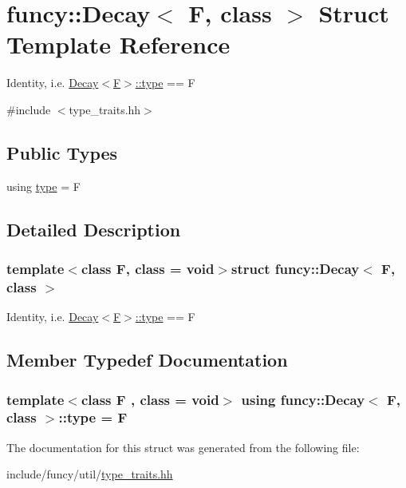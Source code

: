 \hypertarget{structfuncy_1_1Decay}{\section{funcy\-:\-:Decay$<$ F, class $>$ Struct Template Reference}
\label{structfuncy_1_1Decay}
}


Identity, i.\-e. \hyperlink{structfuncy_1_1Decay_a94829178cc43a1c71c43511c8a8836c6}{Decay$<$\-F$>$\-::type} == F  




{\ttfamily \#include $<$type\-\_\-traits.\-hh$>$}

\subsection*{Public Types}
\begin{DoxyCompactItemize}
\item 
using \hyperlink{structfuncy_1_1Decay_a94829178cc43a1c71c43511c8a8836c6}{type} = F
\end{DoxyCompactItemize}


\subsection{Detailed Description}
\subsubsection*{template$<$class F, class = void$>$struct funcy\-::\-Decay$<$ F, class $>$}

Identity, i.\-e. \hyperlink{structfuncy_1_1Decay_a94829178cc43a1c71c43511c8a8836c6}{Decay$<$\-F$>$\-::type} == F 

\subsection{Member Typedef Documentation}
\hypertarget{structfuncy_1_1Decay_a94829178cc43a1c71c43511c8a8836c6}{
\subsubsection[{type}]{\setlength{\rightskip}{0pt plus 5cm}template$<$class F , class  = void$>$ using {\bf funcy\-::\-Decay}$<$ F, class $>$\-::{\bf type} =  F}}\label{structfuncy_1_1Decay_a94829178cc43a1c71c43511c8a8836c6}


The documentation for this struct was generated from the following file\-:\begin{DoxyCompactItemize}
\item 
include/funcy/util/\hyperlink{type__traits_8hh}{type\-\_\-traits.\-hh}\end{DoxyCompactItemize}
